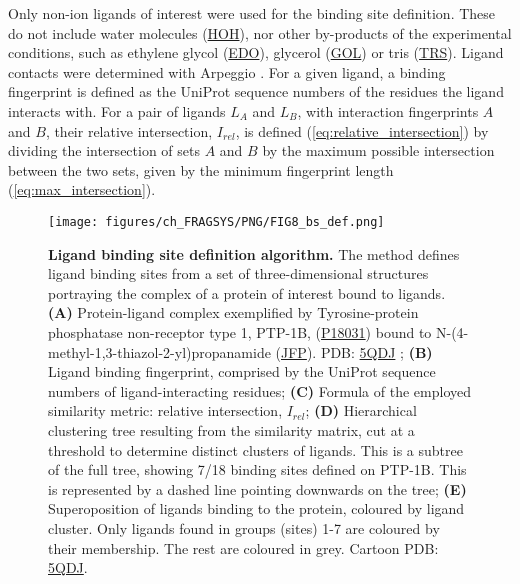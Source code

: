 Only non-ion ligands of interest were used for the binding site definition. These do not include water molecules (\href{https://www.ebi.ac.uk/pdbe-srv/pdbechem/chemicalCompound/show/HOH}{HOH}), nor other by-products of the experimental conditions, such as ethylene glycol (\href{https://www.ebi.ac.uk/pdbe-srv/pdbechem/chemicalCompound/show/EDO}{EDO}), glycerol (\href{https://www.ebi.ac.uk/pdbe-srv/pdbechem/chemicalCompound/show/GOL}{GOL}) or tris (\href{https://www.ebi.ac.uk/pdbe-srv/pdbechem/chemicalCompound/show/TRS}{TRS}). Ligand contacts were determined with Arpeggio \cite{JUBB_2017_ARPEGGIO}. For a given ligand, a binding fingerprint is defined as the UniProt sequence numbers of the residues the ligand interacts with. For a pair of ligands $L_{A}$ and $L_{B}$, with interaction fingerprints $A$ and $B$, their relative intersection, $I_{rel}$, is defined (\autoref{eq:relative_intersection}) by dividing the intersection of sets $A$ and $B$ by the maximum possible intersection between the two sets, given by the minimum fingerprint length (\autoref{eq:max_intersection}).

\begin{figure}[htb!]
    \centering
    \texttt{[image: figures/ch\_FRAGSYS/PNG/FIG8\_bs\_def.png]}
    \caption[Ligand binding site definition algorithm]{\textbf{Ligand binding site definition algorithm.} The method defines ligand binding sites from a set of three-dimensional structures portraying the complex of a protein of interest bound to ligands. \textbf{(A)} Protein-ligand complex exemplified by Tyrosine-protein phosphatase non-receptor type 1, PTP-1B, (\href{https://www.uniprot.org/uniprotkb/P18031/entry}{P18031}) bound to N-(4-methyl-1,3-thiazol-2-yl)propanamide (\href{https://www.ebi.ac.uk/pdbe-srv/pdbechem/chemicalCompound/show/JFP}{JFP}). PDB: \href{https://www.ebi.ac.uk/pdbe/entry/pdb/5qdj}{5QDJ} \cite{KEEDY_2018_PTP1B}; \textbf{(B)} Ligand binding fingerprint, comprised by the UniProt sequence numbers of ligand-interacting residues; \textbf{(C)} Formula of the employed similarity metric: relative intersection, $I_{rel}$; \textbf{(D)} Hierarchical clustering tree resulting from the similarity matrix, cut at a threshold to determine distinct clusters of ligands. This is a subtree of the full tree, showing 7/18 binding sites defined on PTP-1B. This is represented by a dashed line pointing downwards on the tree; \textbf{(E)} Superoposition of ligands binding to the protein, coloured by ligand cluster. Only ligands found in groups (sites) 1-7 are coloured by their membership. The rest are coloured in grey. Cartoon PDB: \href{https://www.ebi.ac.uk/pdbe/entry/pdb/5qdj}{5QDJ}.}
    \label{fig:fragsys_bs_def}
\end{figure}

